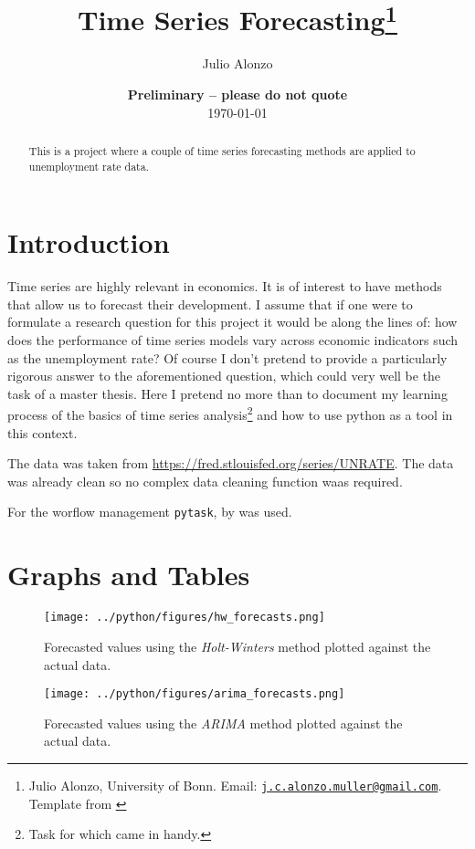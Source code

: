 \documentclass[11pt, a4paper, leqno]{article}
\title{Time Series Forecasting\thanks{Julio Alonzo, University of Bonn. Email: \href{mailto:j.c.alonzo.muller@gmail.com}{\nolinkurl{j.c.alonzo.muller@gmail.com}}. Template from \cite{GaudeckerEconProjectTemplates}}}
\author{Julio Alonzo}
\date{
    {\bf Preliminary -- please do not quote}
    \\[1ex]
    \today
}
\begin{document}
\maketitle

\begin{abstract}
This is a project where a couple of time series forecasting methods are applied to unemployment rate data.
\end{abstract}

\section{Introduction}

Time series are highly relevant in economics. It is of interest to have methods that allow us to forecast their development.
I assume that if one were to formulate a research question for this project it would be along the lines of: how does the performance of time series models vary across economic indicators such as the unemployment rate?
Of course I don't pretend to provide a particularly rigorous answer to the aforementioned question, which could very well be the task of a master thesis. Here I pretend no more than to document my learning process of the basics of time series analysis\footnote{Task for which \cite{huang2022applied} came in handy.} and how to use python as a tool in this context.

The data was taken from \url{https://fred.stlouisfed.org/series/UNRATE}. The data was already clean so no complex data cleaning function waas required.

For the worflow management \texttt{pytask}, by \citet{Raabe2020} was used.

\section{Graphs and Tables}

\begin{figure}[H]

    \centering
    \texttt{[image: ../python/figures/hw\_forecasts.png]}

    \caption{Forecasted values using the \emph{Holt-Winters} method plotted against the actual data.}
    \label{fig:hw}

\end{figure}

\begin{figure}[H]

    \centering
    \texttt{[image: ../python/figures/arima\_forecasts.png]}

    \caption{Forecasted values using the \emph{ARIMA} method plotted against the actual data.}
    \label{fig:arima}

\end{figure}
\end{document}
